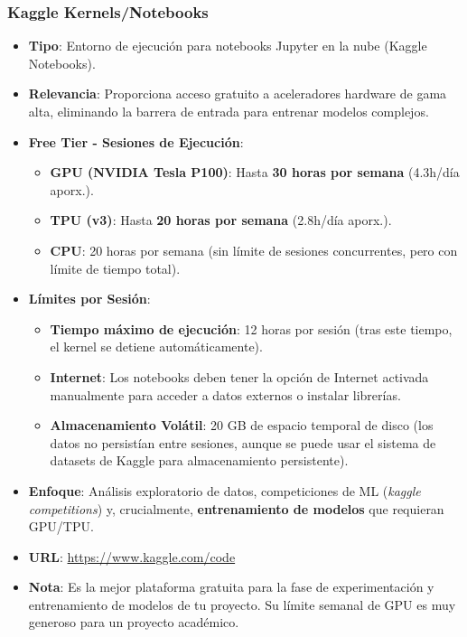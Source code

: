 \subsubsection*{Kaggle Kernels/Notebooks}
\begin{itemize}
	\item \textbf{Tipo}: Entorno de ejecución para notebooks Jupyter en la nube (Kaggle Notebooks).
	\item \textbf{Relevancia}: Proporciona acceso gratuito a aceleradores hardware de gama alta, eliminando la barrera de entrada para entrenar modelos complejos.
	\item \textbf{Free Tier - Sesiones de Ejecución}:
	\begin{itemize}
		\item \textbf{GPU (NVIDIA Tesla P100)}: Hasta \textbf{30 horas por semana} (4.3h/día aporx.).
		\item \textbf{TPU (v3)}: Hasta \textbf{20 horas por semana} (2.8h/día aporx.).
		\item \textbf{CPU}: 20 horas por semana (sin límite de sesiones concurrentes, pero con límite de tiempo total).
	\end{itemize}
	\item \textbf{Límites por Sesión}:
	\begin{itemize}
		\item \textbf{Tiempo máximo de ejecución}: 12 horas por sesión (tras este tiempo, el kernel se detiene automáticamente).
		\item \textbf{Internet}: Los notebooks deben tener la opción de Internet activada manualmente para acceder a datos externos o instalar librerías.
		\item \textbf{Almacenamiento Volátil}: 20 GB de espacio temporal de disco (los datos no persistían entre sesiones, aunque se puede usar el sistema de datasets de Kaggle para almacenamiento persistente).
	\end{itemize}
	\item \textbf{Enfoque}: Análisis exploratorio de datos, competiciones de ML (\textit{kaggle competitions}) y, crucialmente, \textbf{entrenamiento de modelos} que requieran GPU/TPU.
	\item \textbf{URL}: \url{https://www.kaggle.com/code}
	\item \textbf{Nota}: Es la mejor plataforma gratuita para la fase de experimentación y entrenamiento de modelos de tu proyecto. Su límite semanal de GPU es muy generoso para un proyecto académico.
\end{itemize}





